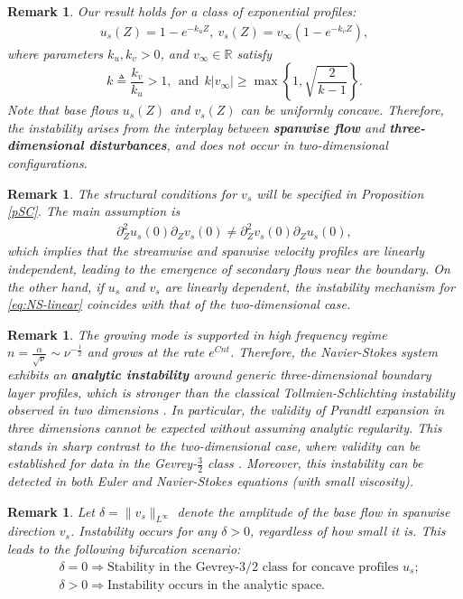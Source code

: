 \documentclass[reqno,11pt]{amsart}
\numberwithin{equation}{section}
\numberwithin{equation}{section}
\theoremstyle{plain}
\newtheorem{remark}[theorem]{Remark}
\begin{document}
\begin{remark}
Our result holds for a class of exponential profiles:
 	\begin{align}
 	u_s(Z)=1-e^{-k_{u}Z},~v_s(Z)=v_{\infty}(1-e^{-k_vZ}),\nonumber
 \end{align}
where parameters $k_u,k_v>0$, and $v_{\infty}\in\mathbb{R}$ satisfy
$$k\triangleq\frac{k_v}{k_u}>1, ~~\text{and}~~ k|v_{\infty}|\geq \max\left\{1,\sqrt{\frac{2}{k-1}}\right\}.
$$
Note that base flows $u_s(Z)$ and $v_s(Z)$ can be uniformly concave. Therefore, the instability arises from the interplay between \textbf{spanwise flow} and \textbf{three-dimensional disturbances}, and does not occur in two-dimensional configurations.
\end{remark}
\begin{remark} 	
	The structural conditions for $v_s$ will be specified in Proposition \ref{pSC}. The main assumption is
	\begin{align}
		\partial_Z^2u_s(0)\partial_Zv_s(0)\neq\partial_Z^2v_s(0)\partial_Zu_s(0),\nonumber
	\end{align}
	which implies that the streamwise and spanwise velocity profiles are linearly independent, leading to the emergence of secondary flows near the boundary.  On the other hand, if $u_s$ and $v_s$ are linearly dependent,  the instability mechanism for \eqref{eq:NS-linear} coincides with that of the two-dimensional case.  
\end{remark}

\begin{remark}        
   The growing mode is supported in high frequency regime $n=\frac{\alpha}{\sqrt{\nu}}\sim \nu^{-\frac{1}{2}}$ and grows at the rate $e^{Cnt}$. Therefore, the Navier-Stokes system exhibits an  \textbf{analytic instability} around generic three-dimensional boundary layer profiles, which is stronger than the classical Tollmien-Schlichting instability observed in two dimensions \cite{GGN-DMJ}. In particular, the validity of Prandtl expansion in three dimensions cannot be expected without assuming analytic regularity. This stands in sharp contrast to the two-dimensional case, where validity can be established for data in the Gevrey-$\frac32$ class \cite{GMM-duke}.   Moreover, this instability can be detected in both Euler and Navier-Stokes equations (with small viscosity).
 \end{remark}       

             
    \begin{remark} Let $\delta=\|v_s\|_{L^\infty}$ denote the amplitude of the base flow in spanwise direction $v_s$. Instability occurs for any $\delta>0$, regardless of how small it is. This leads to the following bifurcation scenario:
    	\begin{align}
    	&\delta=0 \Rightarrow \text{Stability in the Gevrey-$3/2$ class for concave profiles $u_s$};\nonumber\\
    	&\delta>0\Rightarrow \text{Instability occurs in the analytic space}.\nonumber
    	\end{align}
      \end{remark}   
  
\end{document}
